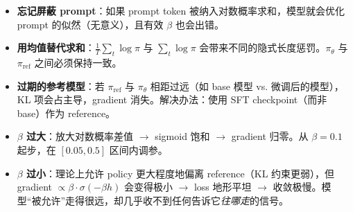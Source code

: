 \begin{warningbox}
\begin{itemize}
  \item \textbf{忘记屏蔽 prompt}：如果 prompt token 被纳入对数概率求和，模型就会优化 prompt 的似然（无意义），且有效 $\beta$ 也会出错。
  \item \textbf{用均值替代求和}：$\frac{1}{T}\sum_t \log\pi$ 与 $\sum_t \log\pi$ 会带来不同的隐式长度惩罚。$\pi_\theta$ 与 $\pi_{\text{ref}}$ 之间必须保持一致。
  \item \textbf{过期的参考模型}：若 $\pi_{\text{ref}}$ 与 $\pi_\theta$ 相距过远（如 base 模型 vs. 微调后的模型），KL 项会占主导，gradient 消失。解决办法：使用 SFT checkpoint（而非 base）作为 reference。
  \item \textbf{$\beta$ 过大}：放大对数概率差值 $\rightarrow$ sigmoid 饱和 $\rightarrow$ gradient 归零。从 $\beta = 0.1$ 起步，在 $[0.05, 0.5]$ 区间内调参。
  \item \textbf{$\beta$ 过小}：理论上允许 policy 更大程度地偏离 reference（KL 约束更弱），但 gradient $\propto \beta \cdot \sigma(-\beta h)$ 会变得极小 $\rightarrow$ loss 地形平坦 $\rightarrow$ 收敛极慢。模型“被允许”走得很远，却几乎收不到任何告诉它\emph{往哪走}的信号。
\end{itemize}
\end{warningbox}

